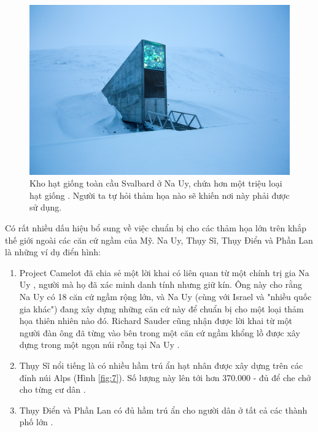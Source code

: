 \documentclass[10pt,twocolumn,letterpaper]{article}
\begin{document}
\begin{figure}[t]
\begin{center}
   \includegraphics[width=1\linewidth]{svalbard.jpg}
\end{center}
   \caption{Kho hạt giống toàn cầu Svalbard ở Na Uy, chứa hơn một triệu loại hạt giống \cite{24}. Người ta tự hỏi thảm họa nào sẽ khiến nơi này phải được sử dụng.}
\label{fig:8}
\label{fig:onecol}
\end{figure}

Có rất nhiều dấu hiệu bổ sung về việc chuẩn bị cho các thảm họa lớn trên khắp thế giới ngoài các căn cứ ngầm của Mỹ. Na Uy, Thụy Sĩ, Thụy Điển và Phần Lan là những ví dụ điển hình:
\begin{flushleft}
\begin{enumerate}
    \item Project Camelot đã chia sẻ một lời khai có liên quan từ một chính trị gia Na Uy \cite{25,26}, người mà họ đã xác minh danh tính nhưng giữ kín. Ông này cho rằng Na Uy có 18 căn cứ ngầm rộng lớn, và Na Uy (cùng với Israel và "nhiều quốc gia khác") đang xây dựng những căn cứ này để chuẩn bị cho một loại thảm họa thiên nhiên nào đó. Richard Sauder cũng nhận được lời khai từ một người đàn ông đã từng vào bên trong một căn cứ ngầm khổng lồ được xây dựng trong một ngọn núi rỗng tại Na Uy \cite{22}.
    \item Thụy Sĩ nổi tiếng là có nhiều hầm trú ẩn hạt nhân được xây dựng trên các đỉnh núi Alps (Hình \ref{fig:7}). Số lượng này lên tới hơn 370.000 - đủ để che chở cho từng cư dân \cite{27}.
    \item Thụy Điển và Phần Lan có đủ hầm trú ẩn cho người dân ở tất cả các thành phố lớn \cite{27}.
\end{enumerate}
\end{flushleft}
\end{document}

